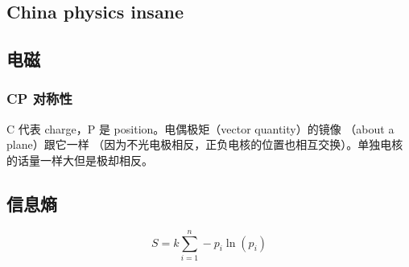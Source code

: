 \begin{CJK*}{UTF8}{gbsn}
\chapter{China physics insane}

\section{电磁}
\subsection{CP 对称性}
C 代表 charge，P 是 position。电偶极矩（vector quantity）的镜像 （about a plane）跟它一样 （因为不光电极相反，正负电核的位置也相互交换）。单独电核的话量一样大但是极却相反。

\section{信息熵}
\begin{equation}
    S=k \sum_{i=1}^{n} -p_i \ln (p_i)
\end{equation}


\end{CJK*}